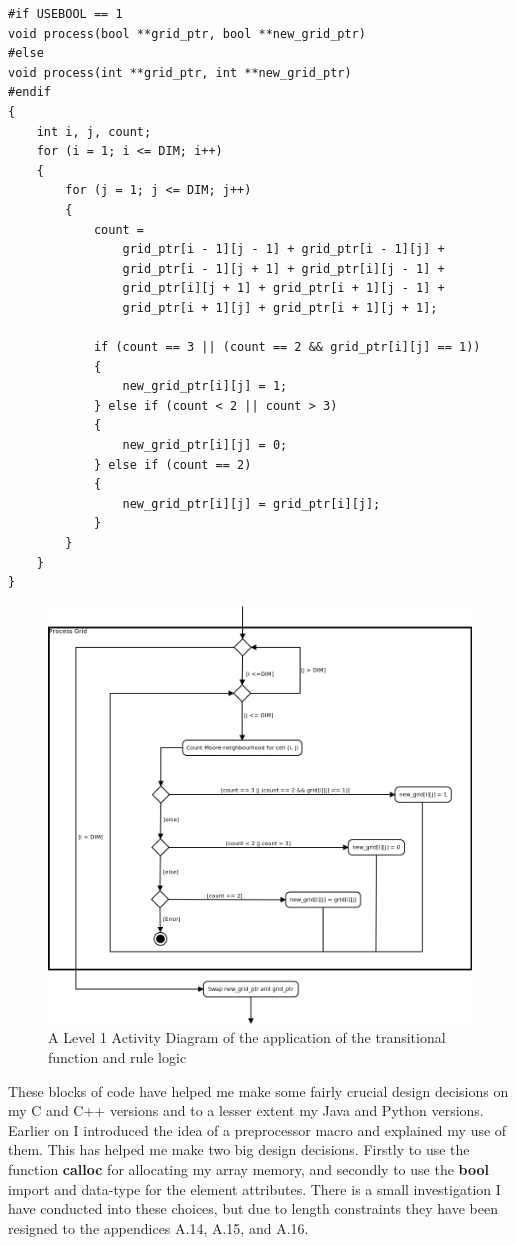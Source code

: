 \documentclass[11pt]{article} %
\begin{document}
\begin{lstlisting}[caption={Processing the Moore-neighbourhood and writing to the next generations global state array}]
#if USEBOOL == 1
void process(bool **grid_ptr, bool **new_grid_ptr)
#else
void process(int **grid_ptr, int **new_grid_ptr)
#endif
{
	int i, j, count;
	for (i = 1; i <= DIM; i++)
	{
		for (j = 1; j <= DIM; j++)
		{
			count =
			    grid_ptr[i - 1][j - 1] + grid_ptr[i - 1][j] +
			    grid_ptr[i - 1][j + 1] + grid_ptr[i][j - 1] +
			    grid_ptr[i][j + 1] + grid_ptr[i + 1][j - 1] +
			    grid_ptr[i + 1][j] + grid_ptr[i + 1][j + 1];

			if (count == 3 || (count == 2 && grid_ptr[i][j] == 1))
			{
				new_grid_ptr[i][j] = 1;
			} else if (count < 2 || count > 3)
			{
				new_grid_ptr[i][j] = 0;
			} else if (count == 2)
			{
				new_grid_ptr[i][j] = grid_ptr[i][j];
			}
		}
	}
}
\end{lstlisting}
\begin{figure}[h]
\centering
\includegraphics[scale=0.4]{sequentialProcessGrid.png}
\caption{A Level 1 Activity Diagram of the application of the transitional function and rule logic}
\label{fig: Algo0}
\end{figure}
These blocks of code have helped me make some fairly crucial design decisions on my C and C++ versions and to a lesser extent my Java and Python versions. Earlier on I introduced the idea of a preprocessor macro and explained my use of them. This has helped me make two big design decisions. Firstly to use the function {\bf calloc} for allocating my array memory, and secondly to use the {\bf bool} import and data-type for the element attributes. There is a small investigation I have conducted into these choices, but due to length constraints they have been resigned to the appendices A.14, A.15, and A.16. 
\end{document}
